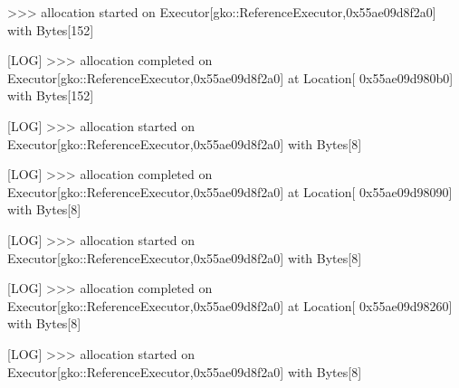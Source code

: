 \begin{DoxyCode}
[LOG] >>> allocation started on Executor[gko::ReferenceExecutor,0x55ae09d8f2a0] with Bytes[152]            
                                                                                                                  
                                                               
[LOG] >>> allocation completed on Executor[gko::ReferenceExecutor,0x55ae09d8f2a0] at Location[
      0x55ae09d980b0] with Bytes[152]                                                                                          
                                                               
[LOG] >>> allocation started on Executor[gko::ReferenceExecutor,0x55ae09d8f2a0] with Bytes[8]              
                                                                                                                  
                                                               
[LOG] >>> allocation completed on Executor[gko::ReferenceExecutor,0x55ae09d8f2a0] at Location[
      0x55ae09d98090] with Bytes[8]                                                                                            
                                                               
[LOG] >>> allocation started on Executor[gko::ReferenceExecutor,0x55ae09d8f2a0] with Bytes[8]              
                                                                                                                  
                                                               
[LOG] >>> allocation completed on Executor[gko::ReferenceExecutor,0x55ae09d8f2a0] at Location[
      0x55ae09d98260] with Bytes[8]                                                                                            
                                                               
[LOG] >>> allocation started on Executor[gko::ReferenceExecutor,0x55ae09d8f2a0] with Bytes[8]              
                                                                                                                  

\end{DoxyCode}
